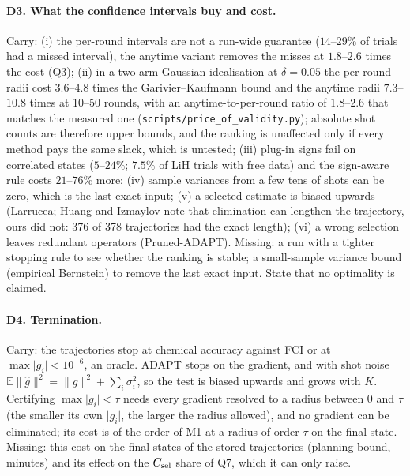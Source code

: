 \documentclass[11pt]{article}
\begin{document}
\paragraph{D3. What the confidence intervals buy and cost.} Carry: (i) the per-round intervals are not a run-wide guarantee ($14$--$29\%$ of trials had a missed interval), the anytime variant removes the misses at $1.8$--$2.6$ times the cost (Q3); (ii) in a two-arm Gaussian idealisation at $\delta=0.05$ the per-round radii cost $3.6$--$4.8$ times the Garivier--Kaufmann bound and the anytime radii $7.3$--$10.8$ times at 10--50 rounds, with an anytime-to-per-round ratio of $1.8$--$2.6$ that matches the measured one (\texttt{scripts/price\_of\_validity.py}); absolute shot counts are therefore upper bounds, and the ranking is unaffected only if every method pays the same slack, which is untested; (iii) plug-in signs fail on correlated states ($5$--$24\%$; $7.5\%$ of LiH trials with free data) and the sign-aware rule costs $21$--$76\%$ more; (iv) sample variances from a few tens of shots can be zero, which is the last exact input; (v) a selected estimate is biased upwards (Larrucea; Huang and Izmaylov note that elimination can lengthen the trajectory, ours did not: 376 of 378 trajectories had the exact length); (vi) a wrong selection leaves redundant operators (Pruned-ADAPT). Missing: a run with a tighter stopping rule to see whether the ranking is stable; a small-sample variance bound (empirical Bernstein) to remove the last exact input. State that no optimality is claimed.

\paragraph{D4. Termination.} Carry: the trajectories stop at chemical accuracy against FCI or at $\max\lvert g_i\rvert<10^{-6}$, an oracle. ADAPT stops on the gradient, and with shot noise $\mathbb E\lVert\hat g\rVert^2=\lVert g\rVert^2+\sum_i\sigma_i^2$, so the test is biased upwards and grows with $K$. Certifying $\max\lvert g_i\rvert<\tau$ needs every gradient resolved to a radius between $0$ and $\tau$ (the smaller its own $\lvert g_i\rvert$, the larger the radius allowed), and no gradient can be eliminated; its cost is of the order of M1 at a radius of order $\tau$ on the final state. Missing: this cost on the final states of the stored trajectories (planning bound, minutes) and its effect on the $C_{\rm sel}$ share of Q7, which it can only raise.
\end{document}
